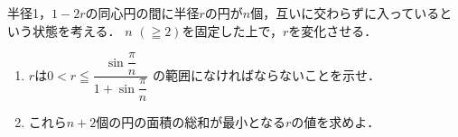 \documentclass[../../main.tex]{subfiles}
\begin{document}
半径1，$1-2r$の同心円の間に半径$r$の円が$n$個，互いに交わらずに入っているという状態を考える．
$n$ $(\geqq2)$を固定した上で，$r$を変化させる．
\begin{enumerate}
  \item $r$は$\displaystyle0<r\leqq\dfrac{\displaystyle\sin\dfrac{\pi}{n}}{\displaystyle1+\sin\dfrac{\pi}{n}}$
    の範囲になければならないことを示せ．
  \item これら$n+2$個の円の面積の総和が最小となる$r$の値を求めよ．
\end{enumerate}
\end{document}
